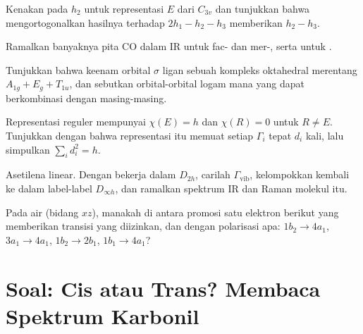 \begin{exercise}[$\star\star$]\label{exo:b3:group-theory-applied:7}
Kenakan  pada $h_2$ untuk representasi $E$ dari $C_{3v}$ dan
tunjukkan bahwa mengortogonalkan hasilnya terhadap $2h_1 - h_2 - h_3$
memberikan $h_2 - h_3$.
\end{exercise}

\begin{exercise}[$\star\star$]\label{exo:b3:group-theory-applied:8}
Ramalkan banyaknya pita CO dalam IR untuk fac- dan mer-, serta
untuk .
\end{exercise}

\begin{exercise}[$\star\star$]\label{exo:b3:group-theory-applied:9}
Tunjukkan bahwa keenam orbital $\sigma$ ligan sebuah kompleks oktahedral
merentang $A_{1g} + E_g + T_{1u}$, dan sebutkan orbital-orbital logam mana yang
dapat berkombinasi dengan masing-masing.
\end{exercise}

\begin{exercise}[$\star\star\star$]\label{exo:b3:group-theory-applied:10}
Representasi reguler mempunyai $\chi(E) = h$ dan $\chi(R) = 0$ untuk $R \ne E$.
Tunjukkan dengan  bahwa representasi itu memuat setiap
 $\Gamma_i$ tepat $d_i$ kali, lalu simpulkan
$\sum_id_i^2 = h$.
\end{exercise}

\begin{exercise}[$\star\star\star$]\label{exo:b3:group-theory-applied:11}
Asetilena  linear. Dengan bekerja dalam $D_{2h}$, carilah
$\Gamma_{\mathrm{vib}}$, kelompokkan kembali ke dalam label-label $D_{\infty h}$,
dan ramalkan spektrum IR dan Raman molekul itu.
\end{exercise}

\begin{exercise}[$\star\star\star$]\label{exo:b3:group-theory-applied:12}
Pada air (bidang $xz$), manakah di antara promosi satu elektron berikut yang
memberikan transisi yang diizinkan, dan dengan polarisasi apa:
$1b_2 \to 4a_1$, $3a_1 \to 4a_1$, $1b_2 \to 2b_1$, $1b_1 \to 4a_1$?
\end{exercise}

\section{Soal: Cis atau Trans? Membaca Spektrum Karbonil}

